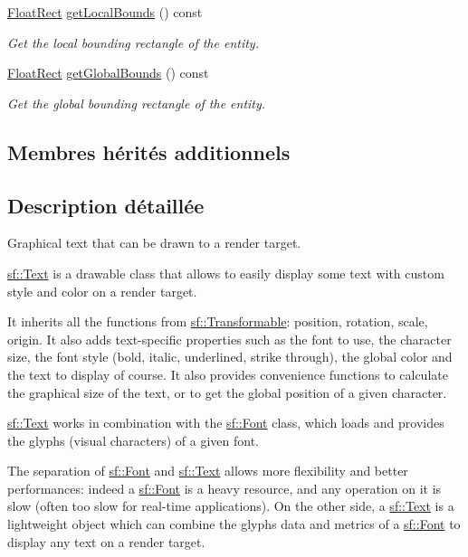 \begin{DoxyCompactItemize}
\hyperlink{classsf_1_1Rect}{Float\+Rect} \hyperlink{classsf_1_1Text_a3e6b3b298827f853b41165eee2cbbc66}{get\+Local\+Bounds} () const
\begin{DoxyCompactList}\small\item\em Get the local bounding rectangle of the entity. \end{DoxyCompactList}\item 
\hyperlink{classsf_1_1Rect}{Float\+Rect} \hyperlink{classsf_1_1Text_ad33ed96ce9fbe99610f7f8b6874a16b4}{get\+Global\+Bounds} () const
\begin{DoxyCompactList}\small\item\em Get the global bounding rectangle of the entity. \end{DoxyCompactList}\end{DoxyCompactItemize}
\subsection*{Membres hérités additionnels}


\subsection{Description détaillée}
Graphical text that can be drawn to a render target. 

\hyperlink{classsf_1_1Text}{sf\+::\+Text} is a drawable class that allows to easily display some text with custom style and color on a render target.

It inherits all the functions from \hyperlink{classsf_1_1Transformable}{sf\+::\+Transformable}\+: position, rotation, scale, origin. It also adds text-\/specific properties such as the font to use, the character size, the font style (bold, italic, underlined, strike through), the global color and the text to display of course. It also provides convenience functions to calculate the graphical size of the text, or to get the global position of a given character.

\hyperlink{classsf_1_1Text}{sf\+::\+Text} works in combination with the \hyperlink{classsf_1_1Font}{sf\+::\+Font} class, which loads and provides the glyphs (visual characters) of a given font.

The separation of \hyperlink{classsf_1_1Font}{sf\+::\+Font} and \hyperlink{classsf_1_1Text}{sf\+::\+Text} allows more flexibility and better performances\+: indeed a \hyperlink{classsf_1_1Font}{sf\+::\+Font} is a heavy resource, and any operation on it is slow (often too slow for real-\/time applications). On the other side, a \hyperlink{classsf_1_1Text}{sf\+::\+Text} is a lightweight object which can combine the glyphs data and metrics of a \hyperlink{classsf_1_1Font}{sf\+::\+Font} to display any text on a render target.

